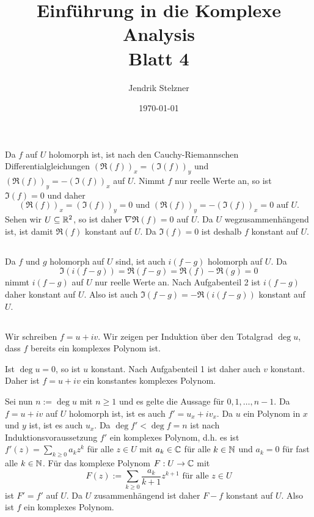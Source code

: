 \documentclass[a4paper,10pt]{article}
\title{\sc Einführung in die Komplexe Analysis \\ \Large Blatt 4}
\author{Jendrik Stelzner}
\date{\today}
\begin{document}
\maketitle






\addtocounter{section}{2}





\section{}


\addtocounter{subsection}{1}
\subsection{}
Da $f$ auf $U$ holomorph ist, ist nach den Cauchy-Riemannschen Differentialgleichungen $(\Re(f))_x = (\Im(f))_y$ und $(\Re(f))_y = -(\Im(f))_x$ auf $U$. Nimmt $f$ nur reelle Werte an, so ist $\Im(f) = 0$ und daher
\[
 (\Re(f))_x = (\Im(f))_y = 0 \text{ und } (\Re(f))_y = -(\Im(f))_x = 0 \text{ auf } U.
\]
Sehen wir $U \subseteq \mathbb{R}^2$, so ist daher $\nabla \Re(f) = 0$ auf $U$. Da $U$ wegzusammenhängend ist, ist damit $\Re(f)$ konstant auf $U$. Da $\Im(f) = 0$ ist deshalb $f$ konstant auf $U$.


\addtocounter{subsection}{-2}
\subsection{}
Da $f$ und $g$ holomorph auf $U$ sind, ist auch $i(f-g)$ holomorph auf $U$. Da
\[
 \Im(i(f-g)) = \Re(f-g) = \Re(f)-\Re(g) = 0
\]
nimmt $i(f-g)$ auf $U$ nur reelle Werte an. Nach Aufgabenteil 2 ist $i(f-g)$ daher konstant auf $U$. Also ist auch $\Im(f-g) = -\Re(i(f-g))$ konstant auf $U$.


\addtocounter{subsection}{1}
\subsection{}
Wir schreiben $f=u+iv$. Wir zeigen per Induktion über den Totalgrad $\deg u$, dass $f$ bereits ein komplexes Polynom ist.

Ist $\deg u = 0$, so ist $u$ konstant. Nach Aufgabenteil 1 ist daher auch $v$ konstant. Daher ist $f = u+iv$ ein konstantes komplexes Polynom.

Sei nun $n := \deg u$ mit $n \geq 1$ und es gelte die Aussage für $0,1,\ldots,n-1$. Da $f = u+iv$ auf $U$ holomorph ist, ist es auch $f' = u_x + i v_x$. Da $u$ ein Polynom in $x$ und $y$ ist, ist es auch $u_x$. Da $\deg f' < \deg f = n$ ist nach Induktionsvoraussetzung $f'$ ein komplexes Polynom, d.h. es ist $f'(z) = \sum_{k \geq 0} a_k z^k$ für alle $z \in U$ mit $a_k \in \mathbb{C}$ für alle $k \in \mathbb{N}$ und $a_k = 0$ für fast alle $k \in \mathbb{N}$. Für das komplexe Polynom $F : U \to \mathbb{C}$ mit
\[
 F(z) := \sum_{k \geq 0} \frac{a_k}{k+1} z^{k+1} \text{ für alle } z \in U
\]
ist $F' = f'$ auf $U$. Da $U$ zusammenhängend ist daher $F-f$ konstant auf $U$. Also ist $f$ ein komplexes Polynom.
\end{document}
